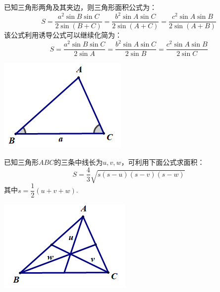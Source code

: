 \documentclass[10pt]{ctexart}
\begin{document}
\begin{minipage}[t]{0.7\textwidth}
\begin{dkyi}{}{}
已知三角形两角及其夹边，则三角形面积公式为：
\[S=\dfrac{a^2 \sin{B} \sin{C}}{2\sin(B+C)}=\dfrac{b^2 \sin{A} \sin{C}}{2\sin(A+C)}=\dfrac{c^2 \sin{A} \sin{B}}{2\sin(A+B)}\]
该公式利用诱导公式可以继续化简为：
\[S=\dfrac{a^2 \sin{B} \sin{C}}{2\sin A}=\dfrac{b^2 \sin{A} \sin{C}}{2\sin B}=\dfrac{c^2 \sin{A} \sin{B}}{2\sin C}\]
\end{dkyi}
\end{minipage}
\begin{minipage}[t]{0.3\textwidth}
\includegraphics[scale=0.6]{figure/mj-08.png}
\end{minipage}


\begin{minipage}[t]{0.7\textwidth}
\begin{dkyi}{}{}
已知三角形$ABC$的三条中线长为$u,v,w$，可利用下面公式求面积：
\[S=\dfrac{4}{3}\sqrt{s(s-u)(s-v)(s-w)}\]
其中$s=\dfrac{1}{2}(u+v+w)$.
\end{dkyi}
\end{minipage}
\begin{minipage}[t]{0.3\textwidth}
\includegraphics[scale=0.6]{figure/mj-11.png}
\end{minipage}
\end{document}
